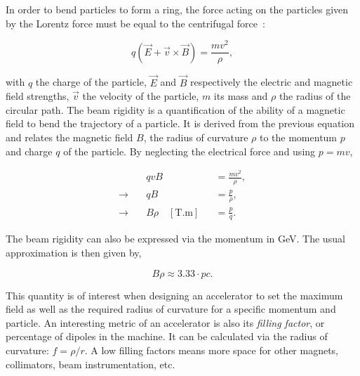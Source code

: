 In order to bend particles to form a ring, the force acting on the particles given by the Lorentz
force must be equal to the centrifugal force~\cite{holzer_design_2020,wiedemann_particle_2015}:

\begin{equation}
    q(\vec{E} + \vec{v} \times \vec{B}) = \frac{mv^2}{\rho},
\end{equation}

with $q$ the charge of the particle, $\vec{E}$ and $\vec{B}$ respectively the electric and magnetic
field strengths, $\vec{v}$ the velocity of the particle, $m$ its mass and $\rho$ the radius of the
circular path. 
The beam rigidity is a quantification of the ability of a magnetic field to bend the trajectory of a
particle. It is derived from the previous equation and relates the
magnetic field $B$, the radius of curvature $\rho$ to the momentum $p$ and charge $q$ of the
particle. By neglecting the electrical force and using $p = mv$,

\begin{equation}
    \begin{aligned}
                           & qvB &&= \frac{mv^2}{\rho}, \\
        \rightarrow  \quad & qB &&= \frac{p}{\rho}, \\
        \rightarrow  \quad & B\rho \quad [\textrm{T.m}] &&= \frac{p}{q}.
    \end{aligned}
    \label{eq:magnetic_fields_beam_rigidity}
\end{equation}

The beam rigidity can also be expressed via the momentum in GeV. The usual approximation is then
given by,

\begin{equation}
    B \rho \approx 3.33 \cdot pc.
\end{equation}

This quantity is of interest when designing an accelerator to set the maximum field as well as the required
radius of curvature for a specific momentum and particle.
An interesting metric of an accelerator is also its \textit{filling factor}, or percentage of
dipoles in the machine. It can be calculated via the radius of curvature: $f = \rho / r$. A low 
filling factors means more space for other magnets, collimators, beam instrumentation, etc.

\subsubsection{}

